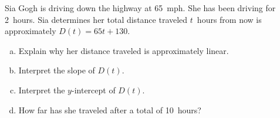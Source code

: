 \documentclass[12pt,letterpaper]{exam}
\begin{document}
\begin{questions}
\newpage
\question[10] Sia Gogh is driving down the highway at 65~mph. She has been driving for 2~hours. Sia determines her total distance traveled $t$~hours from now is approximately $D(t)= 65t + 130$. 
	\begin{enumerate}[(a)]
	\item Explain why her distance traveled is approximately linear.
	\item Interpret the slope of $D(t)$.
	\item Interpret the $y$-intercept of $D(t)$. 
	\item How far has she traveled after a total of 10~hours?
	\end{enumerate}


\end{questions}
\end{document}
